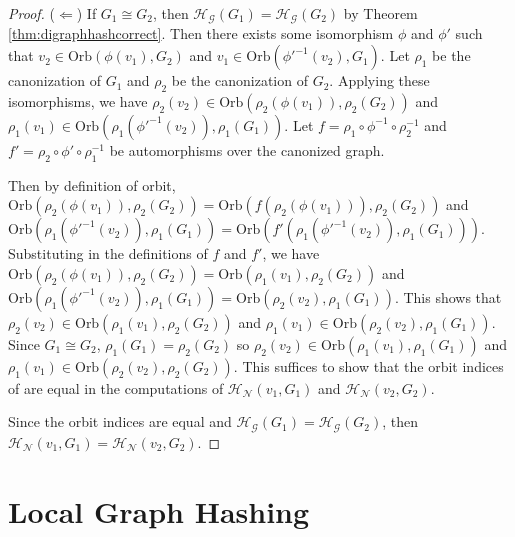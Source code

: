\documentclass[twoside,leqno]{article}
\begin{document}
\begin{proof}
($\Leftarrow$) If $G_1 \cong G_2$, then $\mathcal{H_G}(G_1)=\mathcal{H_G}(G_2)$ by Theorem \ref{thm:digraphhashcorrect}. Then there exists some isomorphism $\phi$ and $\phi'$ such that $v_2 \in \text{Orb}(\phi(v_1),G_2)$ and $v_1 \in \text{Orb}(\phi'^{-1}(v_2),G_1)$. Let $\rho_1$ be the canonization of $G_1$ and $\rho_2$ be the canonization of $G_2$. Applying these isomorphisms, we have $\rho_2(v_2) \in \text{Orb}(\rho_2(\phi(v_1)), \rho_2(G_2))$ and $\rho_1(v_1) \in \text{Orb}(\rho_1(\phi'^{-1}(v_2)),\rho_1(G_1))$. Let $f=\rho_1 \circ \phi^{-1} \circ \rho_2^{-1}$ and $f'=\rho_2 \circ \phi' \circ \rho_1^{-1}$ be automorphisms over the canonized graph.

Then by definition of orbit, $\text{Orb}(\rho_2(\phi(v_1)), \rho_2(G_2))=\text{Orb}(f(\rho_2(\phi(v_1))), \rho_2(G_2))$ and $\text{Orb}(\rho_1(\phi'^{-1}(v_2)),\rho_1(G_1)) = \text{Orb}(f'(\rho_1(\phi'^{-1}(v_2)),\rho_1(G_1)))$. Substituting in the definitions of $f$ and $f'$, we have $\text{Orb}(\rho_2(\phi(v_1)), \rho_2(G_2))=\text{Orb}(\rho_1(v_1), \rho_2(G_2))$ and $\text{Orb}(\rho_1(\phi'^{-1}(v_2)),\rho_1(G_1)) = \text{Orb}(\rho_2(v_2),\rho_1(G_1))$. This shows that $\rho_2(v_2) \in \text{Orb}(\rho_1(v_1), \rho_2(G_2))$ and $\rho_1(v_1) \in \text{Orb}(\rho_2(v_2),\rho_1(G_1))$. Since $G_1 \cong G_2$, $\rho_1(G_1)=\rho_2(G_2)$ so $\rho_2(v_2) \in \text{Orb}(\rho_1(v_1), \rho_1(G_1))$ and $\rho_1(v_1) \in \text{Orb}(\rho_2(v_2),\rho_2(G_2))$. This suffices to show that the orbit indices of are equal in the computations of $\mathcal{H_N}(v_1, G_1)$ and $\mathcal{H_N}(v_2, G_2)$.

Since the orbit indices are equal and $\mathcal{H_G}(G_1)=\mathcal{H_G}(G_2)$, then $\mathcal{H_N}(v_1, G_1)=\mathcal{H_N}(v_2, G_2)$. 
\end{proof}


\section{Local Graph Hashing}
\label{sec:local-graph-hashing}
\end{document}
